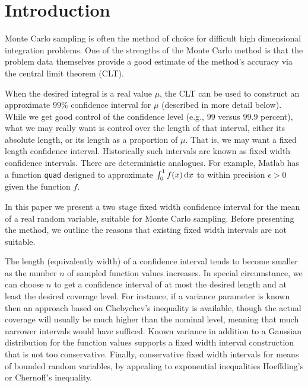 \documentclass{article}
\begin{document}
\newcommand{\hsigma}{\hat\sigma}


\newtheorem{theorem}{Theorem}
\newtheorem{prop}{Proposition}

\section{Introduction}

Monte Carlo sampling is often the method of choice
for difficult high dimensional integration problems.
One of the strengths of the Monte Carlo method is
that the problem data themselves provide a good estimate
of the method's accuracy via the central limit
theorem (CLT). 

When the desired integral is a real value $\mu$, the
CLT can be used to construct an approximate $99$\% confidence interval
for $\mu$ (described in more detail below).
While we get good control of the confidence level 
(e.g., $99$ versus $99.9$ percent), what
we may really want is control over the length
of that interval, either its absolute length, or
its length as a proportion of $\mu$.
That is, we may want a fixed length confidence interval.
Historically such intervals are known as fixed
width confidence intervals.
There are deterministic analogues. For example, Matlab
has a function {\tt quad} designed to approximate $\int_0^1f(x)\,\mathrm{d} x$
to within precision $\epsilon>0$ given the function $f$.

In this paper we present a two stage fixed width
confidence interval for the mean of a real random
variable, suitable for Monte Carlo sampling.
Before presenting the method, we outline the reasons
that existing fixed width intervals are not suitable.

The length (equivalently width) of a confidence interval
tends to become smaller as the number $n$ of sampled
function values increases.
In special circumstance, we can choose $n$ to get
a confidence interval of at most the desired length and at
least the desired coverage level. For instance, if a variance
parameter is known then an approach based on Chebychev's
inequality is available, though the actual coverage
will usually be much higher than the nominal level,
meaning that much narrower intervals would have sufficed.
Known variance in addition to
a Gaussian distribution for the function values
supports a fixed width interval construction that
is not too conservative. 
Finally, conservative fixed width intervals
for means of bounded random variables, by appealing
to exponential inequalities Hoeffding's or Chernoff's inequality.
\end{document}
